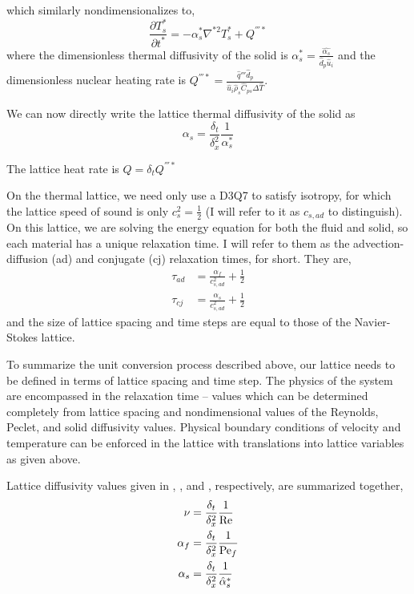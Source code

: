 which similarly nondimensionalizes to,
\begin{equation}\label{eq:non-dim-energy-solid}
	\frac{\partial T^*_s}{\partial t^*} = -\alpha_s^* \nabla^{*2}T^*_s + Q^{'''*}
\end{equation}
where the dimensionless thermal diffusivity of the solid is $\alpha_s^* = \frac{\hat{\alpha_s}}{\hat{d}_p\hat{u}_i}$ and the dimensionless nuclear heating rate is $Q^{'''*} = \frac{\hat{q}'''\hat{d}_p}{\hat{u}_{i}\hat{\rho}_s\hat{C}_{ps}\Delta\hat{T}}$.

We can now directly write the lattice thermal diffusivity of the solid as
\begin{equation}\label{eq:solid-alpha}
	\alpha_s = \frac{\delta_t}{\delta_x^2}\frac{1}{\alpha_s^*}
\end{equation}

The lattice heat rate is $Q = \delta_tQ^{'''*}$

On the thermal lattice, we need only use a D3Q7 to satisfy isotropy, for which the lattice speed of sound is only $c_s^2 = \frac{1}{2}$ (I will refer to it as $c_{s,ad}$ to distinguish). On this lattice, we are solving the energy equation for both the fluid and solid, so each material has a unique relaxation time. I will refer to them as the advection-diffusion (ad) and conjugate (cj) relaxation times, for short. They are,
\begin{subequations}
\begin{align}
	\tau_{ad} &= \frac{\alpha_f}{c_{s,ad}^2} + \frac{1}{2} \\
	\tau_{cj} &= \frac{\alpha_s}{c_{s,ad}^2} + \frac{1}{2}
\end{align}
\end{subequations}
and the size of lattice spacing and time steps are equal to those of the Navier-Stokes lattice.

To summarize the unit conversion process described above, our lattice needs to be defined in terms of lattice spacing and time step. The physics of the system are encompassed in the relaxation time -- values which can be determined completely from lattice spacing and nondimensional values of the Reynolds, Peclet, and solid diffusivity values. Physical boundary conditions of velocity and temperature can be enforced in the lattice with translations into lattice variables as given above. 

Lattice diffusivity values given in , , and , respectively, are summarized together,
\begin{align*}
	\nu &= \frac{\delta_t}{\delta_x^2}\frac{1}{\mathrm{Re}} \\
	\alpha_f &= \frac{\delta_t}{\delta_x^2}\frac{1}{\mathrm{Pe}_f} \\
	\alpha_s &= \frac{\delta_t}{\delta_x^2}\frac{1}{\hat\alpha_s^*}
\end{align*}

